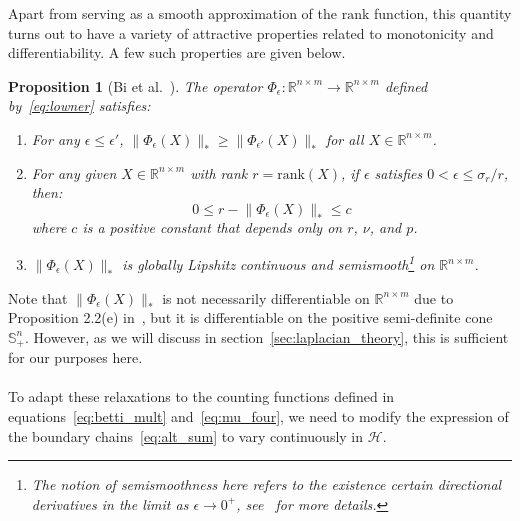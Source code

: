 \documentclass[12pt]{article}
\numberwithin{equation}{section}
\newcommand{\+}{%
	\raisebox{0.18ex}{\scaleobj{0.55}{+}}
}
\newtheorem{proposition}{Proposition}
\theoremstyle{definition}
\begin{document}
\noindent Apart from serving as a smooth approximation of the $\mathrm{rank}$ function, this quantity turns out to have a variety of attractive properties related to monotonicity and differentiability.
A few such properties are given below. 
\begin{proposition}[Bi et al.~\cite{bi2013approximation}] The operator $\Phi_\epsilon: \mathbb{R}^{n \times m} \to \mathbb{R}^{n \times m}$ defined by~\eqref{eq:lowner} satisfies: 
	\begin{enumerate}
		\item For any $\epsilon \leq \epsilon'$, $\lVert \Phi_{\epsilon}(X) \rVert_\ast \geq \lVert \Phi_{\epsilon'}(X) \rVert_\ast$ for all $X \in \mathbb{R}^{n \times m}$.
		\item For any given $X \in \mathbb{R}^{n \times m}$ with rank $r = \mathrm{rank}(X)$, if $\epsilon$ satisfies $0 < \epsilon \leq \sigma_r / r$, then: 
		$$ 0 \leq r - \lVert \Phi_\epsilon(X) \rVert_\ast \leq c $$
		where $c$ is a positive constant that depends only on $r$, $\nu$, and $p$. 
		\item $\lVert \Phi_\epsilon(X) \rVert_\ast$ is globally Lipshitz continuous and semismooth\footnote{The notion of semismoothness here refers to the existence certain directional derivatives in the limit as $\epsilon \to 0^+$, see~\cite{} for more details.} on $\mathbb{R}^{n \times m}$.
	\end{enumerate}
\end{proposition}
\noindent Note that $\lVert\Phi_\epsilon(X)\rVert_\ast$ is not necessarily differentiable on $\mathbb{R}^{n \times m}$ due to Proposition 2.2(e) in~\cite{bi2013approximation}, but it is differentiable on the positive semi-definite cone $\mathbb{S}^n_+$. However, as we will discuss in section~\ref{sec:laplacian_theory}, this is sufficient for our purposes here. 
\\
\\
\noindent To adapt these relaxations to the counting functions defined in equations~\eqref{eq:betti_mult} and~\eqref{eq:mu_four}, we need to modify the expression of the boundary chains~\eqref{eq:alt_sum} to vary continuously in $\mathcal{H}$. 
\end{document}
